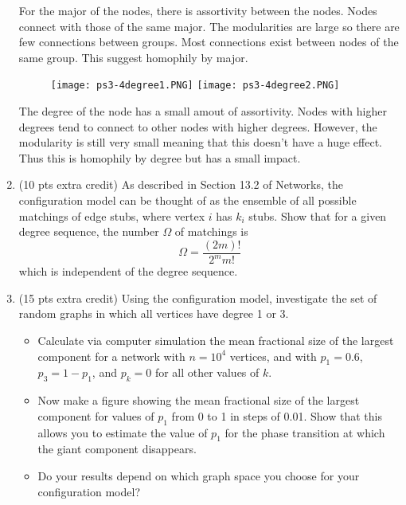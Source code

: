 \documentclass[12pt,letterpaper]{article}
\begin{document}
\begin{enumerate}
    For the major of the nodes, there is assortivity between the nodes. Nodes connect with those of the same major. The modularities are large so there are few connections between groups. Most connections exist between nodes of the same group. This suggest homophily by major.

    \begin{figure}[!h]
        \centering
        \texttt{[image: ps3-4degree1.PNG]}
        \texttt{[image: ps3-4degree2.PNG]}
    \end{figure}

    The degree of the node has a small amout of assortivity. Nodes with higher degrees tend to connect to other nodes with higher degrees. However, the modularity is still very small meaning that this doesn't have a huge effect. Thus this is homophily by degree but has a small impact.

    \newpage
    \item (10 pts extra credit) As described in Section 13.2 of Networks, the configuration model can be thought of as the ensemble of all possible matchings of edge stubs, where vertex $i$ has $k_i$ stubs. Show that for a given degree sequence, the number $\Omega$ of matchings is
    $$\Omega = \frac{(2m)!}{2^m m!}$$
    which is independent of the degree sequence.

    \item  (15 pts extra credit) Using the configuration model, investigate the set of random graphs in which all vertices have degree 1 or 3.

    \begin{itemize}
        \item Calculate via computer simulation the mean fractional size of the largest component for a network with $n = 10^4$ vertices, and with $p_1 = 0.6$, $p_3 = 1 − p_1$, and $p_k = 0$ for all other values of $k$.

        \item Now make a figure showing the mean fractional size of the largest component for values of $p_1$ from 0 to 1 in steps of 0.01. Show that this allows you to estimate the value of $p_1$ for the phase transition at which the giant component disappears.

        \item Do your results depend on which graph space you choose for your configuration model?
    \end{itemize}
\end{enumerate}
\end{document}
